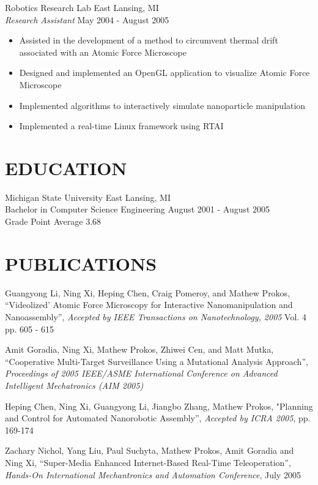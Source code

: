 \documentclass[line]{res}
\begin{document}
\begin{resume}
    \vspace{-2mm}
    Robotics Research Lab \hfill East Lansing, MI\\
    {\sl Research Assistant} \hfill May 2004 - August 2005
    \vspace{1mm}
    \begin{itemize}
      \item Assisted in the development of a method to circumvent thermal drift associated with an Atomic Force Microscope
      \item Designed and implemented an OpenGL application to visualize Atomic Force Microscope
      \item Implemented algorithms to interactively simulate nanoparticle manipulation
      \item Implemented a real-time Linux framework using RTAI
    \end{itemize}

\section{EDUCATION}
\vspace{1mm}
   Michigan State University \hfill East Lansing, MI\\
   Bachelor in Computer Science Engineering \hfill August 2001 - August 2005\\
   Grade Point Average 3.68\\

\vspace{-5mm}
\section{PUBLICATIONS}
   \vspace{1mm}
   Guangyong Li, Ning Xi, Heping Chen, Craig Pomeroy, and Mathew Prokos,
   ``Videolized' Atomic Force Microscopy for Interactive Nanomanipulation and Nanoassembly'',
   \textsl{Accepted by IEEE Transactions on Nanotechnology, 2005} Vol. 4 pp. 605 - 615

   \vspace{-2mm}
   Amit Goradia, Ning Xi, Mathew Prokos, Zhiwei Cen, and Matt Mutka,
   ``Cooperative Multi-Target Surveillance Using a Mutational Analysis Approach'',
   \textsl{Proceedings of 2005 IEEE/ASME International Conference on
      Advanced Intelligent Mechatronics (AIM 2005)}

   \vspace{-2mm}
   Heping Chen, Ning Xi, Guangyong Li, Jiangbo Zhang, Mathew Prokos,
   "Planning and Control for Automated Nanorobotic Assembly'',
   \textsl{Accepted by ICRA 2005}, pp. 169-174

   \vspace{-2mm}
   Zachary Nichol, Yang Liu, Paul Suchyta, Mathew Prokos, Amit Goradia and Ning Xi,
   ``Super-Media Enhanced Internet-Based Real-Time Teleoperation'',
   \textsl{Hands-On International Mechantronics and Automation Conference}, July 2005
\end{resume}
\end{document}
